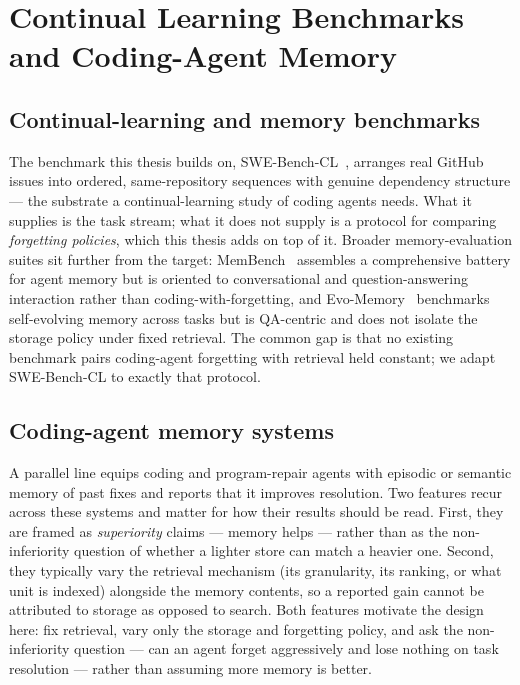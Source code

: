 

\section{Continual Learning Benchmarks and Coding-Agent Memory}

\subsection{Continual-learning and memory benchmarks}

The benchmark this thesis builds on, SWE-Bench-CL~\cite{joshi2025}, arranges real GitHub
issues into ordered, same-repository sequences with genuine dependency structure --- the
substrate a continual-learning study of coding agents needs. What it supplies is the task
stream; what it does not supply is a protocol for comparing \emph{forgetting policies},
which this thesis adds on top of it. Broader memory-evaluation suites sit further from the
target: MemBench~\cite{membench2025} assembles a comprehensive battery for agent memory but
is oriented to conversational and question-answering interaction rather than
coding-with-forgetting, and Evo-Memory~\cite{wei2025evomemory} benchmarks self-evolving
memory across tasks but is QA-centric and does not isolate the storage policy under fixed
retrieval. The common gap is that no existing benchmark pairs coding-agent forgetting with
retrieval held constant; we adapt SWE-Bench-CL to exactly that protocol.

\subsection{Coding-agent memory systems}

A parallel line equips coding and program-repair agents with episodic or semantic memory of
past fixes and reports that it improves resolution. Two features recur across these systems
and matter for how their results should be read. First, they are framed as
\emph{superiority} claims --- memory helps --- rather than as the non-inferiority question
of whether a lighter store can match a heavier one. Second, they typically vary the
retrieval mechanism (its granularity, its ranking, or what unit is indexed) alongside the
memory contents, so a reported gain cannot be attributed to storage as opposed to search.
Both features motivate the design here: fix retrieval, vary only the storage and forgetting
policy, and ask the non-inferiority question --- can an agent forget aggressively and lose
nothing on task resolution --- rather than assuming more memory is better.
